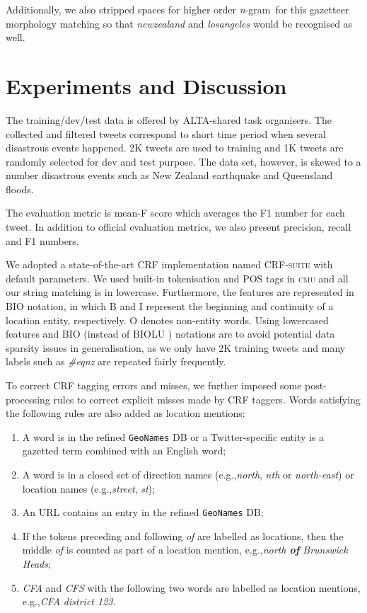 \documentclass[11pt]{article}
\newcommand{\eg}{e.g.,\xspace}
\newcommand{\geoname}{\texttt{GeoNames}\xspace}
\newcommand{\myex}[1]{\textit{#1}}
\newcommand{\method}[1]{\textsf{#1}\xspace}
\newcommand{\ngram}{\textit{n}-gram\ }
\newcommand{\cmu}{\textsc{cmu}\xspace}
\newcommand{\crfsuite}{\textsc{CRF-suite}\xspace}
\begin{document}
Additionally, we also stripped spaces for higher order \ngram for this gazetteer morphology matching so that \myex{newzealand} and \myex{losangeles} would be recognised as well.

\section{Experiments and Discussion}
\label{sec:experiment}

The training/dev/test data is offered by ALTA-shared task organisers.
The collected and filtered tweets correspond to short time period when several disastrous events happened.
2K tweets are used to training and 1K tweets are randomly selected for dev and test purpose.
The data set, however, is skewed to a number disastrous events such as New Zealand earthquake and Queensland floods.

The evaluation metric is mean-F score which averages the F1 number for each tweet.
In addition to official evaluation metrics, we also present precision, recall and F1 numbers.

We adopted a state-of-the-art CRF implementation named \crfsuite \cite{crfsuite} with default parameters.
We used built-in tokenisation and POS tags in \cmu and all our string matching is in lowercase.
Furthermore, the features are represented in \method{BIO} notation, in which \method{B} and \method{I} represent the beginning and continuity of a location entity, respectively.
\method{O} denotes non-entity words.
Using lowercased features and \method{BIO} (instead of \method{BIOLU} \cite{conll09rati}) notations are to avoid potential data sparsity issues in generalisation, as we only have 2K training tweets and many labels such as \myex{\#eqnz} are repeated fairly frequently.

To correct CRF tagging errors and misses, we further imposed some post-processing rules to correct explicit misses made by CRF taggers.
Words satisfying the following rules are also added as location mentions:

\begin{enumerate}
\item A word is in the refined \geoname DB or a Twitter-specific entity is a gazetted term combined with an English word;
\item A word is in a closed set of direction names (\eg \myex{north}, \myex{nth} or \myex{north-east}) or location names (\eg \myex{street}, \myex{st});
\item An URL contains an entry in the refined \geoname DB;
\item If the tokens preceding and following \myex{of} are labelled as locations, then the middle \myex{of} is counted as part of a location mention, \eg \myex{north \textbf{of} Brunswick Heads};
\item \myex{CFA} and \myex{CFS} with the following two words are labelled as location mentions, \eg \myex{CFA district 123}.
\end{enumerate}
\end{document}
